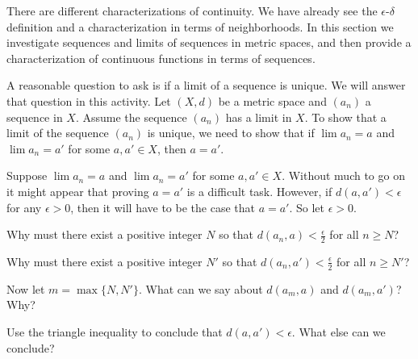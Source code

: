 There are different characterizations of continuity. We have already see the $\epsilon$-$\delta$ definition and a characterization in terms of neighborhoods. In this section we investigate sequences and limits of sequences in metric spaces, and then provide a characterization of continuous functions in terms of sequences. 

\begin{activity} A reasonable question to ask is if a limit of a sequence is unique. We will answer that question in this activity. Let $(X,d)$ be a metric space and $(a_n)$ a sequence in $X$. Assume the sequence $(a_n)$ has a limit in $X$. To show that a limit of the sequence $(a_n)$ is unique, we need to show that if $\lim a_n = a$ and $\lim a_n = a'$ for some $a, a' \in X$, then $a=a'$.

Suppose $\lim a_n = a$ and $\lim a_n = a'$ for some $a, a' \in X$. Without much to go on it might appear that proving $a=a'$ is a difficult task. However, if $d(a,a') < \epsilon$ for any $\epsilon > 0$, then it will have to be the case that $a=a'$. So let $\epsilon > 0$. 

	\ba
	\item Why must there exist a positive integer $N$ so that $d(a_n, a) < \frac{\epsilon}{2}$ for all $n \geq N$?

	\item Why must there exist a positive integer $N'$ so that $d(a_n, a') < \frac{\epsilon}{2}$ for all $n \geq N'$?

	\item Now let $m = \max\{N, N'\}$. What can we say about $d(a_m,a)$ and $d(a_m,a')$? Why?
	
	\item Use the triangle inequality to conclude that $d(a,a') < \epsilon$. What else can we conclude?

	\ea

\end{activity}

